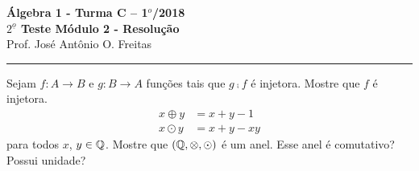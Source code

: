 \documentclass[12pt]{article}
\begin{document}


\begin{center}
{\Large\bf {\'A}lgebra 1 - Turma C -- 1$^{o}$/2018} \\ \vspace{9pt} {\large\bf
  $2^{\underline{o}}$ Teste Módulo 2 - Resolu\c{c}\~ao}\\
\vspace{9pt} Prof. Jos{\'e} Ant{\^o}nio O. Freitas
\end{center}
\hrule

\vspace{.6cm}

\questao Sejam $f : A \to B$ e $g : B \to A$ funções tais que $g \comp f$ é injetora. Mostre que $f$ é injetora.
\begin{align*}
	x \oplus y &= x + y - 1\\
	x \odot y &= x + y - xy
\end{align*}
para todos $x$, $y \in \mathbb{Q}$. Mostre que $(\mathbb{Q}, \otimes, \odot)$ é um anel. Esse anel é comutativo? Possui unidade?
\end{document}

